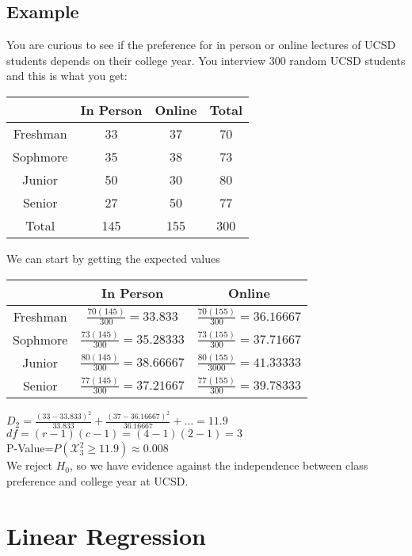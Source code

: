 \documentclass{article}
\begin{document}
\subsection{Example}
You are curious to see if the preference for in person or online lectures of UCSD students depends on their college year. You interview 300 random UCSD students and this is what you get:
\begin{center}
    \begin{tabular}{c|c|c|c}
         & In Person & Online & Total \\
         \hline
       Freshman & 33 & 37 & 70\\
       \hline
       Sophmore & 35 & 38 & 73\\
       \hline
       Junior & 50 & 30 & 80\\
       \hline
       Senior & 27 & 50 & 77\\
       \hline
       Total & 145 & 155 & 300
    \end{tabular}
\end{center}
We can start by getting the expected values
\begin{center}
    \begin{tabular}{c|c|c}
         & In Person & Online \\
         \hline
        Freshman & $\frac{70(145)}{300}=33.833$ & $\frac{70(155)}{300}=36.16667$\\
        \hline
        Sophmore & $\frac{73(145)}{300}=35.28333$ & $\frac{73(155)}{300}=37.71667$\\
        \hline
        Junior & $\frac{80(145)}{300}=38.66667$ & $\frac{80(155)}{3000}=41.33333$\\
        \hline
        Senior & $\frac{77(145)}{300}=37.21667$ & $\frac{77(155)}{300}=39.78333$
    \end{tabular}
\end{center}
$D_2=\frac{(33-33.833)^2}{33.833}+\frac{(37-36.16667)^2}{36.16667}+\dots=11.9$\\
$df=(r-1)(c-1)=(4-1)(2-1)=3$\\
P-Value=$P(\mathcal{X}^2_3\geq11.9)\approx0.008$\\
We reject $H_0$, so we have evidence against the independence between class preference and college year at UCSD.
\section{Linear Regression}
\label{sec:linear}
\end{document}
